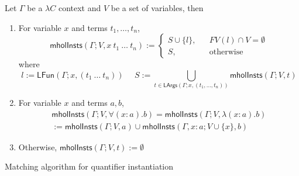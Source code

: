 \begin{definition}
  Let $\Gamma$ be a $\lambda C$ context and $V$ be a set of variables, then
  \begin{enumerate}
    \item For variable $x$ and terms $t_1, \dots, t_n$,
      $$\mathsf{mholInsts}(\Gamma; V, x \ t_1 \ \dots \ t_n) := \left\{
        \begin{aligned}
          S \cup \{l\}, & & FV(l) \cap V = \emptyset \\
          S, & & \text{otherwise}
        \end{aligned}
      \right.$$
      where
      $$l := \mathsf{LFun}(\Gamma; x, (t_1 \ \dots \ t_n)) \ \ \ \ \ \ S := \bigcup_{t \in \mathsf{LArgs}(\Gamma; x, (t_1, \dots, t_n))} \mathsf{mholInsts}(\Gamma; V, t)$$
    \item For variable $x$ and terms $a, b$,
      \begin{align*}
        \mathsf{mholInsts}(\Gamma; V, \forall (x : a). b) = \mathsf{mholInsts}(\Gamma; V, \lambda (x : a). b) 
        \\ := \mathsf{mholInsts}(\Gamma; V, a) \cup \mathsf{mholInsts}(\Gamma, x : a; V \cup \{x\}, b)
      \end{align*}
    \item Otherwise, $\mathsf{mholInsts}(\Gamma; V, t) := \emptyset$
  \end{enumerate}
\end{definition}

\begin{algorithm}\label{matching}
  \DontPrintSemicolon
  \SetNoFillComment
  \caption{Matching algorithm for quantifier instantiation}
\end{algorithm}

